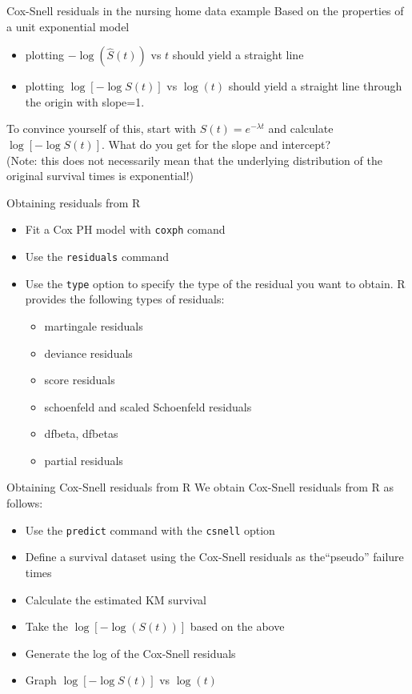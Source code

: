 \documentclass[envcountsect, 10pt, portrait, palatino]{beamer}
\begin{document}
\begin{frame}{Cox-Snell residuals in the nursing home data example}
Based on the properties of a unit exponential model
\begin{itemize}
\item plotting $-\log(\hat{S}(t))$ vs $t$ should yield a straight line
\item plotting $\log[-\log{S}(t)]$ vs $\log(t)$ should yield a
straight line through the origin with slope=1.
\end{itemize}

To convince yourself of this, start with $S(t)=e^{-\lambda t}$ and
calculate $\log[-\log{S}(t)]$.  What do you get for the slope and intercept?
\\[2ex]
(Note: this does not necessarily mean that the underlying
distribution of the original survival times is exponential!)
\end{frame}
\begin{frame}{Obtaining residuals from R}
\begin{itemize}
\item Fit a Cox PH model with {\tt coxph} comand
\item Use the {\tt residuals} command
\item Use the {\tt type} option to specify the type of the residual you want to obtain. R provides the following types of residuals:
\begin{itemize}
  \item martingale residuals
  \item deviance residuals
  \item score residuals
  \item schoenfeld and scaled Schoenfeld residuals
  \item dfbeta, dfbetas
  \item partial residuals
\end{itemize}
\end{itemize}
\end{frame}
\begin{frame}{Obtaining Cox-Snell residuals from R}
We obtain Cox-Snell residuals from R as follows:
\begin{itemize}
\item Use the {\tt predict} command with the {\tt csnell} option
\item Define a survival dataset using the Cox-Snell residuals as the``pseudo'' failure times
\item Calculate the estimated KM survival
\item Take the $\log[-\log(S(t))]$ based on the above
\item Generate the log of the Cox-Snell residuals
\item Graph $\log[-\log{S}(t)]$ vs $\log(t)$
\end{itemize}
\end{frame}
\end{document}
